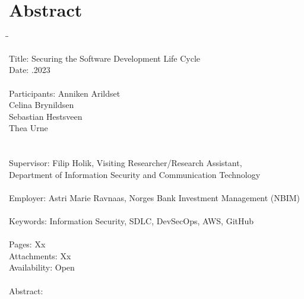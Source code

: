 
\chapter*{Abstract}

\begin{tabbing}
\hspace{2cm}\=\hspace{3cm}\=\kill %

Title: \> \> Securing the Software Development Life Cycle \\
Date: \> .2023 \\ 
\\
Participants: \> \> Anniken Arildset \\ \> \> Celina Brynildsen \\ \> \> Sebastian Hestsveen \\ \> \> Thea Urne \\
\\
\\
Supervisor: \> \> Filip Holik, Visiting Researcher/Research Assistant, \\\> \> Department of Information Security and Communication Technology \\
\\
Employer: \> \>  Astri Marie Ravnaas, Norges Bank Investment Management (NBIM) \\
\\
Keywords: \> \> Information Security, SDLC, DevSecOps, AWS, GitHub \\
\\
Pages: \> \> Xx \\
Attachments: \> \> Xx \\
Availability: \> \> Open \\
\\
Abstract: 



\end{tabbing}

